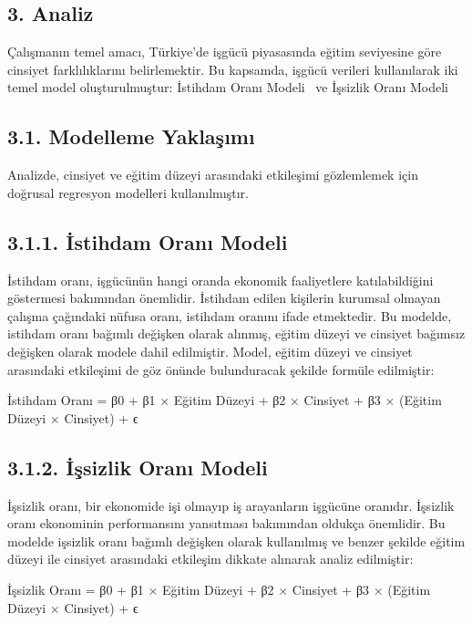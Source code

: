 \documentclass[
  11pt,
  a4paper,
  DIV=11,
  numbers=noendperiod]{scrartcl}
\begin{document}
\subsection{3. Analiz}\label{analiz}

Çalışmanın temel amacı, Türkiye'de işgücü piyasasında eğitim seviyesine
göre cinsiyet farklılıklarını belirlemektir. Bu kapsamda, işgücü
verileri kullanılarak iki temel model oluşturulmuştur: İstihdam Oranı
Modeli~ ve İşsizlik Oranı Modeli

\subsection{3.1. Modelleme
Yaklaşımı}\label{modelleme-yaklaux15fux131mux131}

Analizde, cinsiyet ve eğitim düzeyi arasındaki etkileşimi gözlemlemek
için doğrusal regresyon modelleri kullanılmıştır.

\subsection{3.1.1. İstihdam Oranı
Modeli}\label{istihdam-oranux131-modeli}

İstihdam oranı, işgücünün hangi oranda ekonomik faaliyetlere
katılabildiğini göstermesi bakımından önemlidir. İstihdam edilen
kişilerin kurumsal olmayan çalışma çağındaki nüfusa oranı, istihdam
oranını ifade etmektedir. Bu modelde, istihdam oranı bağımlı değişken
olarak alınmış, eğitim düzeyi ve cinsiyet bağımsız değişken olarak
modele dahil edilmiştir. Model, eğitim düzeyi ve cinsiyet arasındaki
etkileşimi de göz önünde bulunduracak şekilde formüle edilmiştir:

İstihdam Oranı = β0 + β1 × Eğitim Düzeyi + β2 × Cinsiyet + β3 × (Eğitim
Düzeyi × Cinsiyet) + ϵ

\subsection{3.1.2. İşsizlik Oranı
Modeli}\label{iux15fsizlik-oranux131-modeli}

İşsizlik oranı, bir ekonomide işi olmayıp iş arayanların işgücüne
oranıdır. İşsizlik oranı ekonominin performansını yansıtması bakımından
oldukça önemlidir. Bu modelde işsizlik oranı bağımlı değişken olarak
kullanılmış ve benzer şekilde eğitim düzeyi ile cinsiyet arasındaki
etkileşim dikkate alınarak analiz edilmiştir:

İşsizlik Oranı = β0 + β1 × Eğitim Düzeyi + β2 × Cinsiyet + β3 × (Eğitim
Düzeyi × Cinsiyet) + ϵ
\end{document}
